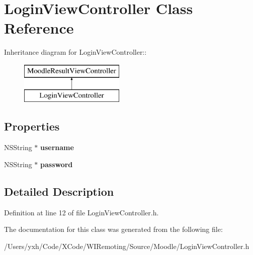 \hypertarget{interface_login_view_controller}{
\section{LoginViewController Class Reference}
\label{interface_login_view_controller}
}
Inheritance diagram for LoginViewController::\begin{figure}[H]
\begin{center}
\leavevmode
\includegraphics[height=2cm]{interface_login_view_controller}
\end{center}
\end{figure}
\subsection*{Properties}
\begin{DoxyCompactItemize}
\item 
\hypertarget{interface_login_view_controller_a4d1385e104bd18bf312cefa56e1ab07b}{
NSString $\ast$ {\bfseries username}}
\label{interface_login_view_controller_a4d1385e104bd18bf312cefa56e1ab07b}

\item 
\hypertarget{interface_login_view_controller_a2677ca8ce9ee6472bde49ed8b725679c}{
NSString $\ast$ {\bfseries password}}
\label{interface_login_view_controller_a2677ca8ce9ee6472bde49ed8b725679c}

\end{DoxyCompactItemize}


\subsection{Detailed Description}


Definition at line 12 of file LoginViewController.h.

The documentation for this class was generated from the following file:\begin{DoxyCompactItemize}
\item 
/Users/yxh/Code/XCode/WIRemoting/Source/Moodle/LoginViewController.h\end{DoxyCompactItemize}

